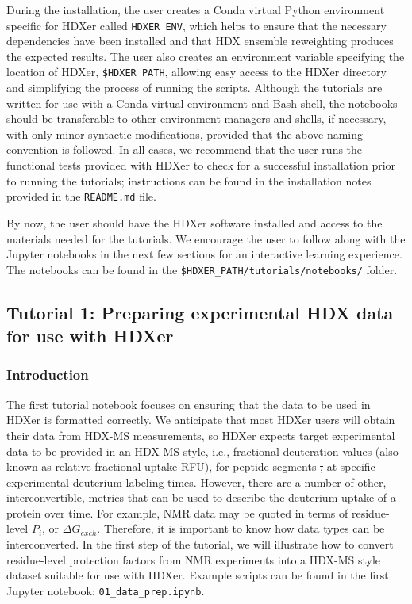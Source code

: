 \documentclass[9pt,tutorial]{livecoms}
\providecommand{\DIFdel}[1]{{\protect\color{red}\sout{#1}}}                      %
\providecommand{\DIFdelbegin}{} %
\providecommand{\DIFdelend}{} %
\begin{document}
During the installation, the user creates a Conda virtual Python environment specific for HDXer called \texttt{HDXER\_ENV}, which helps to ensure that the necessary dependencies have been installed and that HDX ensemble reweighting produces the expected results. 
The user also creates an environment variable specifying the location of HDXer, \texttt{\$HDXER\_PATH}, allowing easy access to the HDXer directory and simplifying the process of running the scripts.
Although the tutorials are written for use with a Conda virtual environment and Bash shell, the notebooks should be transferable to other environment managers and shells, if necessary, with only minor syntactic modifications, provided that the above naming convention is followed. 
In all cases, we recommend that the user runs the functional tests provided with HDXer to check for a successful installation prior to running the tutorials; instructions can be found in the installation notes provided in the \texttt{README.md} file. 

By now, the user should have the HDXer software installed and access to the materials needed for the tutorials. We encourage the user to follow along with the Jupyter notebooks in the next few sections for an interactive learning experience.
The notebooks can be found in the \texttt{\$HDXER\_PATH/tutorials/notebooks/} folder.

\subsection{Tutorial 1: Preparing experimental HDX data for use with HDXer}\label{tutorial_1}

\subsubsection{Introduction}
The first tutorial notebook focuses on ensuring that the data to be used in HDXer is formatted correctly. 
We anticipate that most HDXer users will obtain their data from HDX-MS measurements, so HDXer expects target experimental data to be provided in an HDX-MS style, i.e., fractional deuteration values (also known as relative fractional uptake RFU), for peptide segments \DIFdelbegin \DIFdel{, }\DIFdelend at specific experimental deuterium labeling times. 
However, there are a number of other, interconvertible, metrics that can be used to describe the deuterium uptake of a protein over time. 
For example, NMR data may be quoted in terms of residue-level $P_i$, or $\Delta{G_{exch}}$. 
Therefore, it is important to know how data types can be interconverted. 
In the first step of the tutorial, we will illustrate how to convert residue-level protection factors from NMR experiments into a HDX-MS style dataset suitable for use with HDXer. 
Example scripts can be found in the first Jupyter notebook: \texttt{01\_data\_prep.ipynb}.
\end{document}
